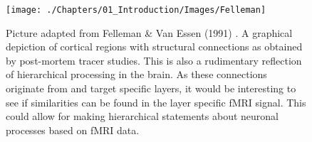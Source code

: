 \begin{figure}[!ht]
	\centering
	\texttt{[image: ./Chapters/01\_Introduction/Images/Felleman]}
	\caption{Picture adapted from Felleman \& Van Essen (1991) \cite{Felleman1991}. A graphical depiction of cortical regions with structural connections as obtained by post-mortem tracer studies. This is also a rudimentary reflection of hierarchical processing in the brain. As these connections originate from and target specific layers, it would be interesting to see if similarities can be found in the layer specific fMRI signal. This could allow for making hierarchical statements about neuronal processes based on fMRI data.}
	\label{fig:felleman}
\end{figure}